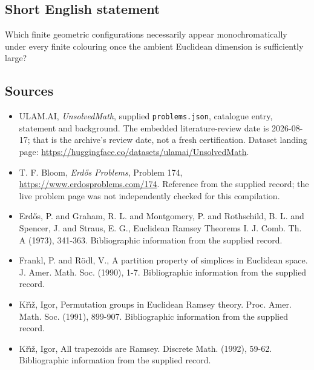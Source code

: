 \documentclass[11pt,a4paper]{article}
\begin{document}
\subsection{Short English statement}

Which finite geometric configurations necessarily appear monochromatically under every finite colouring once the ambient Euclidean dimension is sufficiently large?

\subsection{Sources}

{\small

\begin{itemize}

\item[\hypertarget{source:statement:1}{S1}] ULAM.AI, \emph{UnsolvedMath}, supplied \texttt{problems.json}, catalogue entry, statement and background. The embedded literature-review date is 2026-08-17; that is the archive’s review date, not a fresh certification. Dataset landing page: \url{https://huggingface.co/datasets/ulamai/UnsolvedMath}.

\item[\hypertarget{source:statement:2}{S2}] T. F. Bloom, \emph{Erdős Problems}, Problem 174, \url{https://www.erdosproblems.com/174}. Reference from the supplied record; the live problem page was not independently checked for this compilation.

\item[\hypertarget{source:statement:3}{S3}] Erd\H{o}s, P. and Graham, R. L. and Montgomery, P. and Rothschild, B. L. and Spencer, J. and Straus, E. G., Euclidean Ramsey Theorems I. J. Comb. Th. A (1973), 341-363. Bibliographic information from the supplied record.

\item[\hypertarget{source:statement:4}{S4}] Frankl, P. and R\"{o}dl, V., A partition property of simplices in Euclidean space. J. Amer. Math. Soc. (1990), 1-7. Bibliographic information from the supplied record.

\item[\hypertarget{source:statement:5}{S5}] K\v{r}\'{\i}\v{z}, Igor, Permutation groups in Euclidean Ramsey theory. Proc. Amer. Math. Soc. (1991), 899-907. Bibliographic information from the supplied record.

\item[\hypertarget{source:statement:6}{S6}] K\v{r}\'{\i}\v{z}, Igor, All trapezoids are Ramsey. Discrete Math. (1992), 59-62. Bibliographic information from the supplied record.

\end{itemize}

}

\label{end:statement}
\end{document}
